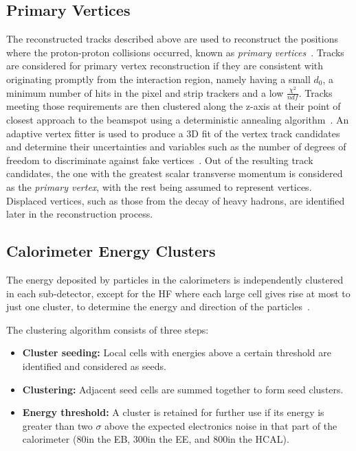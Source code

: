 \subsection{Primary Vertices}\label{subsec:vertices}
The reconstructed tracks described above are used to reconstruct the positions where the proton-proton collisions occurred, known as \emph{primary vertices}~\cite{Chatrchyan:2014fea,Speer:2006mh}.
Tracks are considered for primary vertex reconstruction if they are consistent with originating promptly from the interaction region, namely having a small $d_{0}$, a minimum number of hits in the pixel and strip trackers and a low $\frac{\chi^{2}}{ndf}$.
Tracks meeting those requirements are then clustered along the z-axis at their point of closest approach to the beamspot using a deterministic annealing algorithm~\cite{Kenneth:1998i}.
An adaptive vertex fitter is used to produce a 3D fit of the vertex track candidates and determine their uncertainties and variables such as the number of degrees of freedom to discriminate against fake vertices~\cite{Fruhwirth:2007hz}.
Out of the resulting track candidates, the one with the greatest scalar transverse momentum is considered as the \emph{primary vertex}, with the rest being assumed to represent \PU vertices.
Displaced vertices, such as those from the decay of heavy hadrons, are identified later in the reconstruction process.

\subsection{Calorimeter Energy Clusters}\label{subsec:clustering}
The energy deposited by particles in the calorimeters is independently clustered in each sub-detector, except for the HF where each large cell gives rise at most to just one cluster, to determine the energy and direction of the particles~\cite{CMS:2009nxa}.

The clustering algorithm consists of three steps:
\begin{itemize}
\item \textbf{Cluster seeding:} Local cells with energies above a certain threshold are identified and considered as seeds.
\item \textbf{Clustering:} Adjacent seed cells are summed together to form seed clusters.
\item \textbf{Energy threshold:} A cluster is retained for further use if its energy is greater than two $\sigma$ above the expected electronics noise in that part of the calorimeter (80\MeV in the EB, 300\MeV in the EE, and 800\MeV in the HCAL).
\end{itemize}

